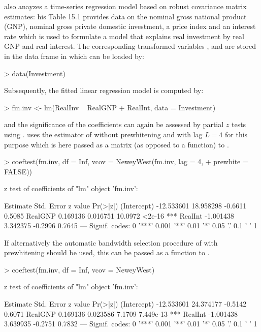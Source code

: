 \documentclass{Z}
\begin{document}
\cite{hac:Greene:1993} also anayzes a time-series regression model
based on robust covariance matrix estimates: his Table 15.1 provides
data on the nominal gross national product (GNP), nominal gross private
domestic investment, a price index and an interest rate which is used
to formulate a model that explains real investment by real GNP and real
interest. The corresponding transformed variables , 
and  are stored in the data frame  in
 which can be loaded by:
\begin{Schunk}
\begin{Sinput}
> data(Investment)
\end{Sinput}
\end{Schunk}
Subsequently, the fitted linear regression model is computed by:
\begin{Schunk}
\begin{Sinput}
> fm.inv <- lm(RealInv ~ RealGNP + RealInt, data = Investment)
\end{Sinput}
\end{Schunk}
and the significance of the coefficients can again be assessed
by partial $z$ tests using . \cite{hac:Greene:1993}
uses the estimator of \cite{hac:Newey+West:1987} without prewhitening and
with lag $L = 4$ for this purpose which is here passed as a matrix (as opposed to a function)
to .
\begin{Schunk}
\begin{Sinput}
> coeftest(fm.inv, df = Inf, vcov = NeweyWest(fm.inv, lag = 4, 
+     prewhite = FALSE))
\end{Sinput}
\begin{Soutput}
z test of coefficients of "lm" object 'fm.inv':

              Estimate Std. Error z value Pr(>|z|)    
(Intercept) -12.533601  18.958298 -0.6611   0.5085    
RealGNP       0.169136   0.016751 10.0972   <2e-16 ***
RealInt      -1.001438   3.342375 -0.2996   0.7645    
---
Signif. codes:  0 '***' 0.001 '**' 0.01 '*' 0.05 '.' 0.1 ' ' 1 
\end{Soutput}
\end{Schunk}
If alternatively the automatic bandwidth selection procedure of \cite{hac:Newey+West:1994}
with prewhitening should be used, this can be passed as a function to .
\begin{Schunk}
\begin{Sinput}
> coeftest(fm.inv, df = Inf, vcov = NeweyWest)
\end{Sinput}
\begin{Soutput}
z test of coefficients of "lm" object 'fm.inv':

              Estimate Std. Error z value  Pr(>|z|)    
(Intercept) -12.533601  24.374177 -0.5142    0.6071    
RealGNP       0.169136   0.023586  7.1709 7.449e-13 ***
RealInt      -1.001438   3.639935 -0.2751    0.7832    
---
Signif. codes:  0 '***' 0.001 '**' 0.01 '*' 0.05 '.' 0.1 ' ' 1 
\end{Soutput}
\end{Schunk}
\end{document}
